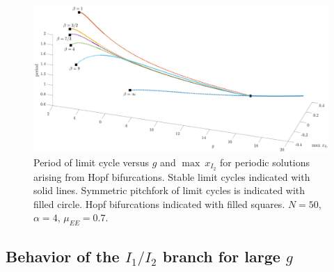 \documentclass[reqno]{siamonline190516}
\begin{document}
\begin{figure}
    \centering
    \includegraphics[width=16cm]{images/periodvsgN50.eps}
    \caption{Period of limit cycle versus $g$ and $\max \: x_{I_2}$ for periodic solutions arising from Hopf bifurcations. Stable limit cycles indicated with solid lines. Symmetric pitchfork of limit cycles is indicated with filled circle. Hopf bifurcations indicated with filled squares. $N = 50$,  $\alpha = 4$, $\mu_{EE} = 0.7$.}
    \label{fig:periodvsg50}
\end{figure}

\subsection{Behavior of the \texorpdfstring{$I_1/I_2$}{I1/I2} branch for large \texorpdfstring{$g$}{g}}\label{sec:stab_largeg}
\end{document}
